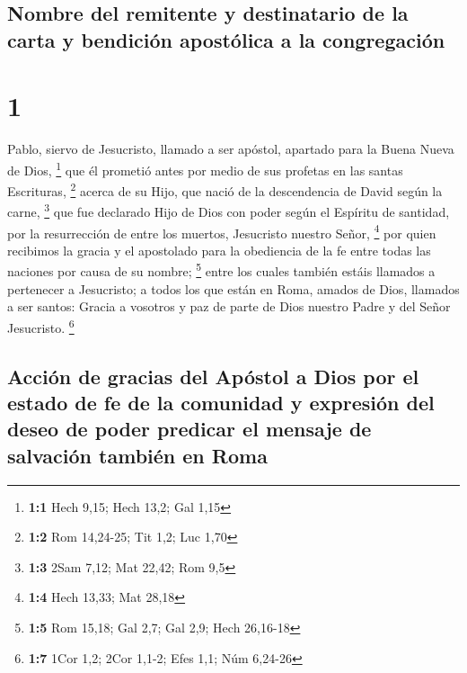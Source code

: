 \hypertarget{nombre-del-remitente-y-destinatario-de-la-carta-y-bendiciuxf3n-apostuxf3lica-a-la-congregaciuxf3n}{%
\subsection{Nombre del remitente y destinatario de la carta y bendición
apostólica a la
congregación}\label{nombre-del-remitente-y-destinatario-de-la-carta-y-bendiciuxf3n-apostuxf3lica-a-la-congregaciuxf3n}}

\hypertarget{section}{%
\section{1}\label{section}}

 Pablo, siervo de Jesucristo, llamado a ser apóstol,
apartado para la Buena Nueva de Dios, \footnote{\textbf{1:1} Hech 9,15;
  Hech 13,2; Gal 1,15}  que él prometió antes por medio de
sus profetas en las santas Escrituras, \footnote{\textbf{1:2} Rom
  14,24-25; Tit 1,2; Luc 1,70}  acerca de su Hijo, que
nació de la descendencia de David según la carne, \footnote{\textbf{1:3}
  2Sam 7,12; Mat 22,42; Rom 9,5}  que fue declarado Hijo
de Dios con poder según el Espíritu de santidad, por la resurrección de
entre los muertos, Jesucristo nuestro Señor, \footnote{\textbf{1:4} Hech
  13,33; Mat 28,18}  por quien recibimos la gracia y el
apostolado para la obediencia de la fe entre todas las naciones por
causa de su nombre; \footnote{\textbf{1:5} Rom 15,18; Gal 2,7; Gal 2,9;
  Hech 26,16-18}  entre los cuales también estáis llamados
a pertenecer a Jesucristo;  a todos los que están en Roma,
amados de Dios, llamados a ser santos: Gracia a vosotros y paz de parte
de Dios nuestro Padre y del Señor Jesucristo. \footnote{\textbf{1:7}
  1Cor 1,2; 2Cor 1,1-2; Efes 1,1; Núm 6,24-26}

\hypertarget{acciuxf3n-de-gracias-del-apuxf3stol-a-dios-por-el-estado-de-fe-de-la-comunidad-y-expresiuxf3n-del-deseo-de-poder-predicar-el-mensaje-de-salvaciuxf3n-tambiuxe9n-en-roma}{%
\subsection{Acción de gracias del Apóstol a Dios por el estado de fe de
la comunidad y expresión del deseo de poder predicar el mensaje de
salvación también en
Roma}\label{acciuxf3n-de-gracias-del-apuxf3stol-a-dios-por-el-estado-de-fe-de-la-comunidad-y-expresiuxf3n-del-deseo-de-poder-predicar-el-mensaje-de-salvaciuxf3n-tambiuxe9n-en-roma}}

